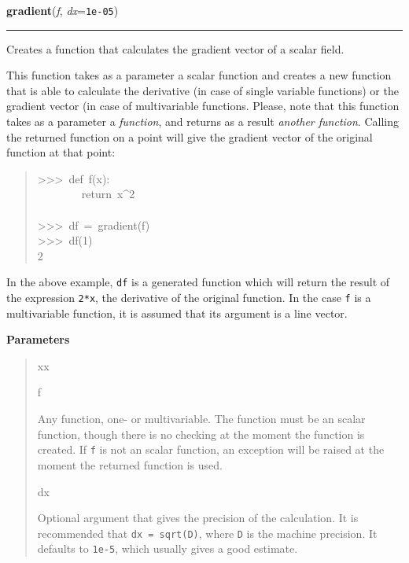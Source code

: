     \begin{boxedminipage}{\textwidth}

    \raggedright \textbf{gradient}(\textit{f}, \textit{dx}=\texttt{1e-05})

    \vspace{-1.5ex}

    \rule{\textwidth}{0.5\fboxrule}

Creates a function that calculates the gradient vector of a scalar field.

This function takes as a parameter a scalar function and creates a new
function that is able to calculate the derivative (in case of single
variable functions) or the gradient vector (in case of multivariable
functions. Please, note that this function takes as a parameter a
\emph{function}, and returns as a result \emph{another function}. Calling the returned
function on a point will give the gradient vector of the original function
at that point:
\begin{quote}{\ttfamily \raggedright \noindent
>{}>{}>~def~f(x):~\\
~~~~~~~~return~x{\textasciicircum}2~\\
~\\
>{}>{}>~df~=~gradient(f)~\\
>{}>{}>~df(1)~\\
2
}\end{quote}

In the above example, \texttt{df} is a generated function which will return the
result of the expression \texttt{2*x}, the derivative of the original function.
In the case \texttt{f} is a multivariable function, it is assumed that its
argument is a line vector.
    \vspace{1ex}

      \textbf{Parameters}
      \begin{quote}
        \begin{Ventry}{xx}

          \item[f]


Any function, one- or multivariable. The function must be an scalar
function, though there is no checking at the moment the function is
created. If \texttt{f} is not an scalar function, an exception will be
raised at the moment the returned function is used.
          \item[dx]


Optional argument that gives the precision of the calculation. It is
recommended that \texttt{dx = sqrt(D)}, where \texttt{D} is the machine precision.
It defaults to \texttt{1e-5}, which usually gives a good estimate.
        \end{Ventry}


\end{quote}
\end{boxedminipage}
